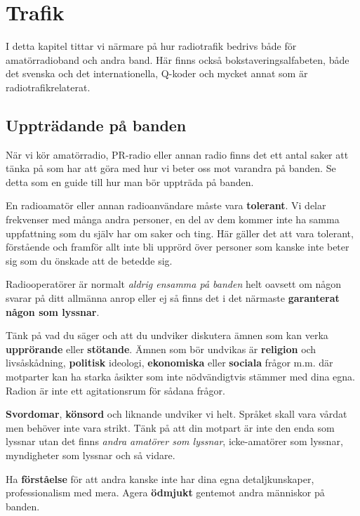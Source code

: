 
\chapter{Trafik}

I detta kapitel tittar vi närmare på hur radiotrafik bedrivs både för
amatörradioband och andra band. Här finns också bokstaveringsalfabeten, både
det svenska och det internationella, Q-koder och mycket annat som är
radio\-trafik\-relaterat.

\clearpage

\section{Uppträdande på banden}

När vi kör amatörradio, PR-radio eller annan radio finns det ett antal saker
att tänka på som har att göra med hur vi beter oss mot varandra på banden. Se
detta som en guide till hur man bör uppträda på banden.

En radioamatör eller annan radioanvändare måste vara \textbf{tolerant}. Vi
delar frekvenser med många andra personer, en del av dem kommer inte ha samma
uppfattning som du själv har om saker och ting. Här gäller det att vara
tolerant, förstående och framför allt inte bli upprörd över personer som
kanske inte beter sig som du önskade att de betedde sig.

Radiooperatörer är normalt \emph{aldrig ensamma på banden} helt oavsett om
någon svarar på ditt allmänna anrop eller ej så finns det i det närmaste
\textbf{garanterat någon som lyssnar}.

Tänk på vad du säger och att du undviker diskutera ämnen som kan verka
\textbf{upprörande} eller \textbf{stötande}. Ämnen som bör undvikas är
\textbf{religion} och livs\-å\-skå\-d\-ni\-ng, \textbf{politisk} ideologi,
\textbf{ekonomiska} eller \textbf{sociala} frågor m.m. där motparter kan ha
starka åsikter som inte nödvändigtvis stämmer med dina egna. Radion är inte
ett agitationsrum för sådana frågor.

\textbf{Svordomar}, \textbf{könsord} och liknande undviker vi helt. Språket
skall vara vårdat men behöver inte vara strikt. Tänk på att din motpart är
inte den enda som lyssnar utan det finns \textit{andra amatörer som lyssnar},
icke-amatörer som lyssnar, myndigheter som lyssnar och så vidare.

Ha \textbf{förståelse} för att andra kanske inte har dina egna
detaljkunskaper, professionalism med mera. Agera \textbf{ödmjukt} gentemot
andra människor på banden.

